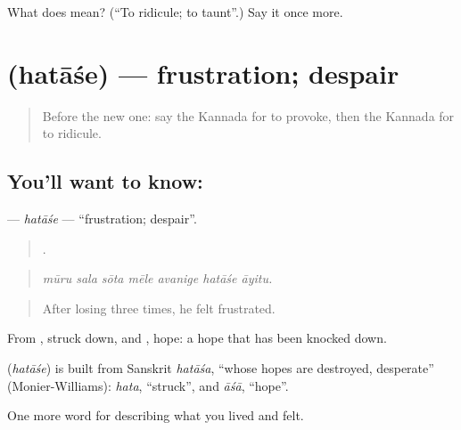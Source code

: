 \begin{tcolorbox}[breakable,colback=teal!4,colframe=teal!35!black,title={Before you move on}]
What does  mean? (\textquotedblleft{}To ridicule; to taunt\textquotedblright{}.) Say it once more.
\end{tcolorbox}
\section[\texorpdfstring{\kn{ಹತಾಶೆ} (hatāśe)}{ಹತಾಶೆ (hatāśe)}]{ (hatāśe) — frustration; despair}

\label{lesson:KA-C493-hatase}



\begin{quote}
Before the new one: say the Kannada for to provoke, then the Kannada for to ridicule.
\end{quote}

\subsection*{You'll want to know: }
\textbf{} — \emph{hatāśe} — \textquotedblleft{}frustration; despair\textquotedblright{}.

\begin{quote}
      .
\end{quote}

\begin{quote}
\emph{mūru sala sōta mēle avanige hatāśe āyitu.}
\end{quote}

\begin{quote}
After losing three times, he felt frustrated.
\end{quote}

From , struck down, and , hope: a hope that has been knocked down.

\begin{cousinweb}
\textbf{} (\emph{hatāśe}) is built from Sanskrit \emph{hatāśa}, \textquotedblleft{}whose hopes are destroyed, desperate\textquotedblright{} (Monier-Williams): \emph{hata}, \textquotedblleft{}struck\textquotedblright{}, and \emph{āśā}, \textquotedblleft{}hope\textquotedblright{}.
\end{cousinweb}

\begin{grammarlens}[title={What you've built}]
One more word for describing what you lived and felt.
\end{grammarlens}

